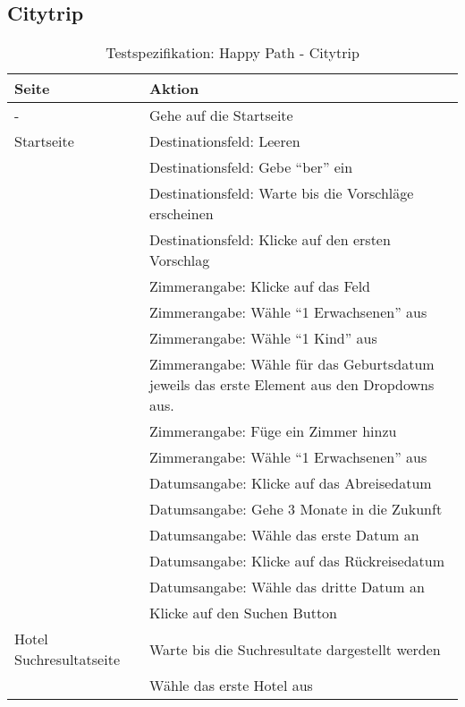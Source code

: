 \subsection{Citytrip}
\begin{table}[H] 
	\caption{Testspezifikation: Happy Path - Citytrip}
	\centering
		
	\begin{tabularx}{0.9\textwidth}{ | l | X | } 
		\hline 
		\textbf{Seite} & \textbf{Aktion} \\ \hline 
		\multirow{1}{*}{-} & Gehe auf die Startseite \\ \hline
		\multirow{1}{*}{Startseite} & Destinationsfeld: Leeren \\ \cline{2-2}
		& Destinationsfeld: Gebe "`ber"' ein \\ \cline{2-2}
		& Destinationsfeld: Warte bis die Vorschläge erscheinen \\ \cline{2-2}
		& Destinationsfeld: Klicke auf den ersten Vorschlag \\ \cline{2-2}
		& Zimmerangabe: Klicke auf das Feld \\ \cline{2-2}
		& Zimmerangabe: Wähle "`1 Erwachsenen"' aus \\ \cline{2-2}
		& Zimmerangabe: Wähle "`1 Kind"' aus \\ \cline{2-2}
		& Zimmerangabe: Wähle für das Geburtsdatum jeweils das erste Element aus den Dropdowns aus.  \\ \cline{2-2}
		& Zimmerangabe: Füge ein Zimmer hinzu \\ \cline{2-2}
		& Zimmerangabe: Wähle "`1 Erwachsenen"' aus \\ \cline{2-2}
		& Datumsangabe: Klicke auf das Abreisedatum \\ \cline{2-2}
		& Datumsangabe: Gehe 3 Monate in die Zukunft \\ \cline{2-2}
		& Datumsangabe: Wähle das erste Datum an \\ \cline{2-2}
		& Datumsangabe: Klicke auf das Rückreisedatum \\ \cline{2-2}
		& Datumsangabe: Wähle das dritte Datum an \\ \cline{2-2}
		& Klicke auf den Suchen Button \\ \hline
		
		\multirow{1}{*}{Hotel Suchresultatseite} & Warte bis die Suchresultate dargestellt werden \\ \cline{2-2}
		& Wähle das erste Hotel aus \\ \hline
		

\end{tabularx}
\end{table}
